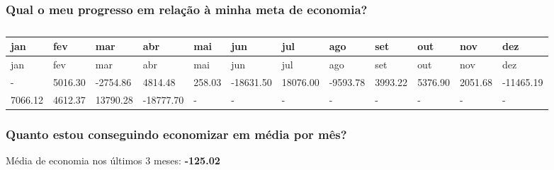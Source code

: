 \documentclass[
  8pt,
  a4paper,
  DIV=11,
  numbers=noendperiod]{scrartcl}
\begin{document}
\subsubsection{Qual o meu progresso em relação à minha meta de
economia?}\label{qual-o-meu-progresso-em-relauxe7uxe3o-uxe0-minha-meta-de-economia}

\begin{longtable}[]{@{}llllllllllll@{}}
\caption{}\label{T_65a51}\tabularnewline
\toprule\noalign{}
jan & fev & mar & abr & mai & jun & jul & ago & set & out & nov & dez \\
\midrule\noalign{}
\endfirsthead
\toprule\noalign{}
jan & fev & mar & abr & mai & jun & jul & ago & set & out & nov & dez \\
\midrule\noalign{}
\endhead
\bottomrule\noalign{}
\endlastfoot
- & 5016.30 & -2754.86 & 4814.48 & 258.03 & -18631.50 & 18076.00 &
-9593.78 & 3993.22 & 5376.90 & 2051.68 & -11465.19 \\
7066.12 & 4612.37 & 13790.28 & -18777.70 & - & - & - & - & - & - & - &
- \\
\end{longtable}

\subsubsection{Quanto estou conseguindo economizar em média por
mês?}\label{quanto-estou-conseguindo-economizar-em-muxe9dia-por-muxeas}

Média de economia nos últimos 3 meses: \textbf{-125.02}
\end{document}
